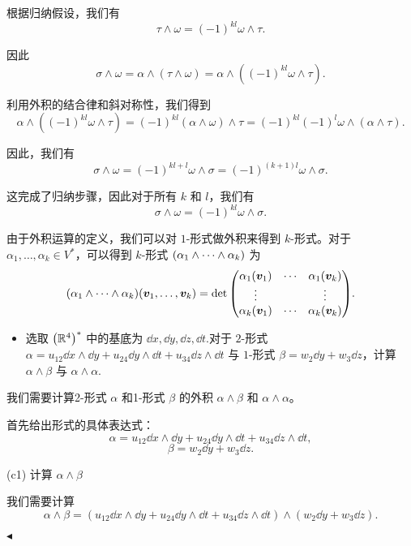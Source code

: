 \documentclass[11pt]{article}
\newenvironment{question}[2][Question]{\begin{trivlist}
\item[\hskip \labelsep {\bfseries #1}\hskip \labelsep {\bfseries #2.}]}{\hfill$\blacktriangleleft$\end{trivlist}}
\newcommand{\RR}{\mathbb{R}}
\begin{document}
\begin{question}{3 (15') (外积)}
    根据归纳假设，我们有
    \[
    \tau \wedge \omega = (-1)^{kl} \omega \wedge \tau.
    \]
    
    因此
    \[
    \sigma \wedge \omega = \alpha \wedge (\tau \wedge \omega) = \alpha \wedge ((-1)^{kl} \omega \wedge \tau).
    \]
    
    利用外积的结合律和斜对称性，我们得到
    \[
    \alpha \wedge ((-1)^{kl} \omega \wedge \tau) = (-1)^{kl} (\alpha \wedge \omega) \wedge \tau = (-1)^{kl} (-1)^{l} \omega \wedge (\alpha \wedge \tau).
    \]
    
    因此，我们有
    \[
    \sigma \wedge \omega = (-1)^{kl+l} \omega \wedge \sigma = (-1)^{(k+1)l} \omega \wedge \sigma.
    \]
    
    这完成了归纳步骤，因此对于所有 \(k\) 和 \(l\)，我们有
    \[
    \sigma \wedge \omega = (-1)^{kl} \omega \wedge \sigma.
    \]
    
    
    由于外积运算的定义，我们可以对 $1$-形式做外积来得到 $k$-形式。对于 $\alpha_1, \ldots, \alpha_k \in V^*$，可以得到 $k$-形式 $\qty(\alpha_1 \wedge \cdots \wedge \alpha_k)$ 为
    \[ \qty(\alpha_1 \wedge \cdots \wedge \alpha_k)\qty(\vb*{v}_1, \ldots, \vb*{v}_k) = \det\mqty(\alpha_1(\vb*{v}_1) & \cdots & \alpha_1(\vb*{v}_k) \\
     \vdots & & \vdots \\ 
     \alpha_k(\vb*{v}_1) & \cdots & \alpha_k(\vb*{v}_k)). \]


    \begin{itemize}
        \item [c (5')] 选取 $\qty(\RR^4)^*$ 中的基底为 $\dd{x}, \dd{y}, \dd{z}, \dd{t}.$对于 $2$-形式 $\alpha = u_{12} \dd{x} \wedge \dd{y} + u_{24} \dd{y} \wedge \dd{t} + u_{34} \dd{z} \wedge \dd{t}$ 与 $1$-形式 $\beta = w_2 \dd{y} + w_3 \dd{z}$，计算 $\alpha \wedge \beta$ 与 $\alpha \wedge \alpha.$
    \end{itemize}

    我们需要计算2-形式 \(\alpha\) 和1-形式 \(\beta\) 的外积 \(\alpha \wedge \beta\) 和 \(\alpha \wedge \alpha\)。
    
    首先给出形式的具体表达式：
    \[
    \alpha = u_{12} \dd{x} \wedge \dd{y} + u_{24} \dd{y} \wedge \dd{t} + u_{34} \dd{z} \wedge \dd{t},
    \]
    \[
    \beta = w_2 \dd{y} + w_3 \dd{z}.
    \]
    
     (c1) 计算 \(\alpha \wedge \beta\)
    
    我们需要计算
    \[
    \alpha \wedge \beta = \left( u_{12} \dd{x} \wedge \dd{y} + u_{24} \dd{y} \wedge \dd{t} + u_{34} \dd{z} \wedge \dd{t} \right) \wedge \left( w_2 \dd{y} + w_3 \dd{z} \right).
    \]
    

\end{question}
\end{document}
